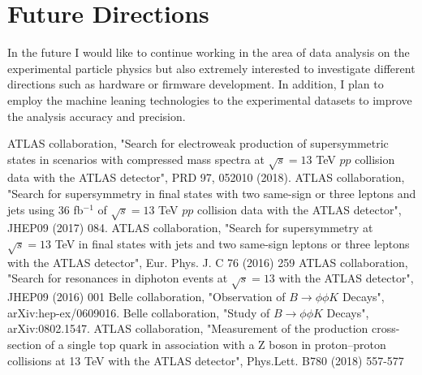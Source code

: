 \documentclass[12pt]{article}
\begin{document}

\section{Future Directions}
In the future I would like to continue working in the area of data analysis on the experimental particle physics but also  extremely interested to investigate different directions such as hardware or firmware development.
In addition, I plan to employ the machine leaning technologies to the experimental datasets to improve the analysis accuracy and precision.


\begin{thebibliography}{999}
 ATLAS collaboration, "Search for electroweak production of supersymmetric states in scenarios with compressed mass spectra at $\sqrt{s} = 13$ TeV $pp$ collision data with the ATLAS detector", PRD 97, 052010 (2018).
 ATLAS collaboration, "Search for supersymmetry in final states with two same-sign or three leptons and jets using 36 fb$^{-1}$ of $\sqrt{s} = 13$ TeV $pp$ collision data with the ATLAS detector", JHEP09 (2017) 084.
 ATLAS collaboration, "Search for supersymmetry at $\sqrt{s} = 13$ TeV in final states with jets and two same-sign leptons or three leptons with the ATLAS detector", Eur. Phys. J. C 76 (2016) 259
 ATLAS collaboration, "Search for resonances in diphoton events at $\sqrt{s} = 13$ with the ATLAS detector", JHEP09 (2016) 001
 Belle collaboration, "Observation of $B \to \phi \phi K$ Decays", arXiv:hep-ex/0609016.
 Belle collaboration, "Study of $B \to \phi \phi K$ Decays", arXiv:0802.1547.
ATLAS collaboration, "Measurement of the production cross-section of a single top quark in association with a Z boson in proton–proton collisions at 13 TeV with the ATLAS detector", Phys.Lett. B780 (2018) 557-577
\end{thebibliography}
\end{document}
